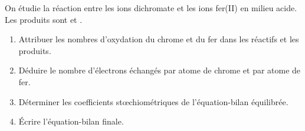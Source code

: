 \documentclass[11pt]{article}
\begin{document}
\begin{exercice}
On étudie la réaction entre les ions dichromate  et les ions fer(II)  en milieu acide. Les produits sont  et .
\begin{enumerate}
    \item Attribuer les nombres d'oxydation du chrome et du fer dans les réactifs et les produits.
    \item Déduire le nombre d'électrons échangés par atome de chrome et par atome de fer.
    \item Déterminer les coefficients stœchiométriques de l'équation-bilan équilibrée.
    \item Écrire l'équation-bilan finale.
\end{enumerate}
\end{exercice}
\end{document}
